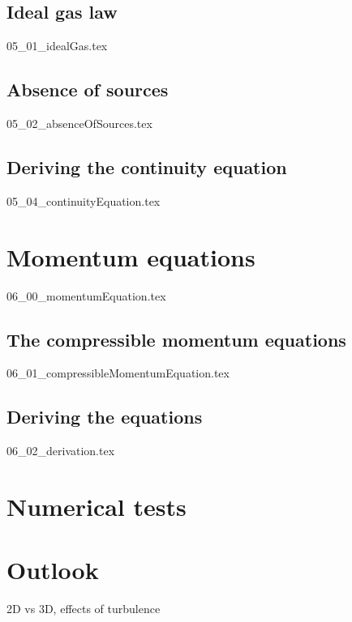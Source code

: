 \documentclass[12pt,a4paper,twoside]{article}
\begin{document}
\subsection{Ideal gas law}
\label{sub: Ideal gas law}
{05_01_idealGas.tex}

\subsection{Absence of sources}
\label{sub: Absence of sources}
{05_02_absenceOfSources.tex}

\subsection{Deriving the continuity equation}
\label{sub: Deriving the continuity equation}
{05_04_continuityEquation.tex}

\section{Momentum equations}
\label{sec: Momentum equations}
{06_00_momentumEquation.tex}

\subsection{The compressible momentum equations}
\label{sub: The compressible momentum equations}
{06_01_compressibleMomentumEquation.tex}

\subsection{Deriving the equations}
\label{sub: Deriving the equations}
{06_02_derivation.tex}

\section{Numerical tests}
\label{sec: Numerics}

\section{Outlook}
\label{sec: Outlook}
2D vs 3D, effects of turbulence
\end{document}
